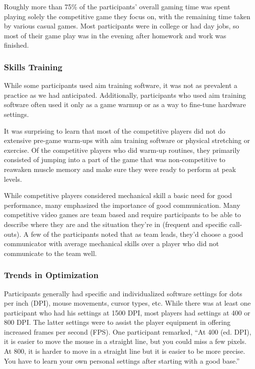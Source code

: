 \documentclass[sigconf]{acmart}
\begin{document}
Roughly more than 75\% of the participants’ overall gaming time was spent playing solely the competitive game they focus on, with the remaining time taken by various casual games. Most participants were in college or had day jobs, so most of their game play was in the evening after homework and work was finished. 

\subsubsection{Skills Training}

While some participants used aim training software, it was not as prevalent a practice as we had anticipated. Additionally, participants who used aim training software often used it only as a game warmup or as a way to fine-tune hardware settings. 

It was surprising to learn that most of the competitive players did not do extensive pre-game warm-ups with aim training software or physical stretching or exercise. Of the competitive players who did warm-up routines, they primarily consisted of jumping into a part of the game that was non-competitive to reawaken muscle memory and make sure they were ready to perform at peak levels.

While competitive players considered mechanical skill a basic need for good performance, many emphasized the importance of good communication. Many competitive video games are team based and require participants to be able to describe where they are and the situation they’re in (frequent and specific call-outs). A few of the participants noted that as team leads, they’d choose a good communicator with average mechanical skills over a player who did not communicate to the team well.

\subsubsection{Trends in Optimization}

Participants generally had specific and individualized software settings for dots per inch (DPI), mouse movements, cursor types, etc. While there was at least one participant who had his settings at 1500 DPI, most players had settings at 400 or 800 DPI. The latter settings were to assist the player equipment in offering increased frames per second (FPS). One participant remarked, “At 400 (ed. DPI), it is easier to move the mouse in a straight line, but you could miss a few pixels. At 800, it is harder to move in a straight line but it is easier to be more precise. You have to learn your own personal settings after starting with a good base.”
\end{document}

